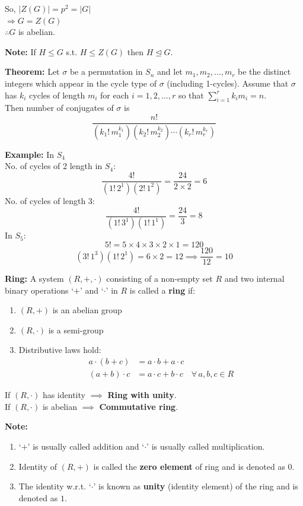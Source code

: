 \documentclass[11pt]{article}
\begin{document}
\noindent So, $\vert{}Z(G)\vert{} = p^2 = \vert{}G\vert{}$ \\
$\Rightarrow G = Z(G)$ \\
$\therefore G$ is abelian.

\bigskip
\noindent \textbf{Note:} If $H \le G$ s.t. $H \le Z(G)$ then $H \trianglelefteq G$.

\bigskip
\noindent \textbf{Theorem:} Let $\sigma$ be a permutation in $S_n$ and let $m_1, m_2, \dots, m_r$ be the distinct integers which appear in the cycle type of $\sigma$ (including 1-cycles). Assume that $\sigma$ has $k_i$ cycles of length $m_i$ for each $i = 1, 2, \dots, r$ so that $\sum_{i=1}^r k_i m_i = n$. \\
Then number of conjugates of $\sigma$ is
\[\frac{n!}{(k_1! \, m_1^{k_1})(k_2! \, m_2^{k_2}) \cdots (k_r! \, m_r^{k_r})}\]

\newpage
\noindent \textbf{Example:} In $S_4$ \\
No. of cycles of 2 length in $S_4$:
\[\frac{4!}{(1! \, 2^1)(2! \, 1^2)} = \frac{24}{2 \times 2} = 6\]
No. of cycles of length 3:
\[\frac{4!}{(1! \, 3^1)(1! \, 1^1)} = \frac{24}{3} = 8\]
In $S_5$:
\[5! = 5 \times 4 \times 3 \times 2 \times 1 = 120\]
\[(3! \, 1^3)(1! \, 2^1) = 6 \times 2 = 12 \implies \frac{120}{12} = 10\]

\bigskip
\noindent \textbf{Ring:} A system $(R, +, \cdot)$ consisting of a non-empty set $R$ and two internal binary operations `$+$' and `$\cdot$' in $R$ is called a \textbf{ring} if:
\begin{enumerate}
    \item $(R, +)$ is an abelian group
    \item $(R, \cdot)$ is a semi-group
    \item Distributive laws hold:
    \begin{align*}
    a \cdot (b + c) &= a \cdot b + a \cdot c \\
    (a + b) \cdot c &= a \cdot c + b \cdot c \quad \forall\, a, b, c \in R
    \end{align*}
\end{enumerate}

\noindent If $(R, \cdot)$ has identity $\implies$ \textbf{Ring with unity}. \\
If $(R, \cdot)$ is abelian $\implies$ \textbf{Commutative ring}.

\bigskip
\noindent \textbf{Note:}
\begin{enumerate}
    \item `$+$' is usually called addition and `$\cdot$' is usually called multiplication.
    \item Identity of $(R, +)$ is called the \textbf{zero element} of ring and is denoted as $0$.
    \item The identity w.r.t. `$\cdot$' is known as \textbf{unity} (identity element) of the ring and is denoted as $1$.
\end{enumerate}
\end{document}
